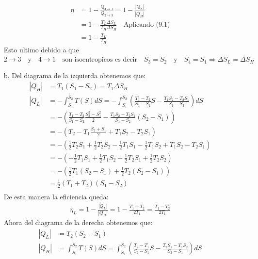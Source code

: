 \documentclass[a4paper]{article}
\begin{document}
\begin{answer}[Punto 9]
\begin{itemize}
            \begin{align*}
                \eta &= 1 - \frac{Q_{4\rightarrow 1}}{Q_{2\rightarrow 3}} = 1 - \frac{|Q_L|}{|Q_H|}\\
                &= 1 - \frac{T_L \Delta S_L}{T_H \Delta S_H} \quad \text{Aplicando (9.1)}\\
                &= 1 - \frac{T_L}{T_H} \quad 
            \end{align*}
            Esto ultimo debido a que  $2\rightarrow 3 \quad \text{y} \quad 4\rightarrow 1 \quad \text{son isoentropicos es decir} \quad S_3 = S_2 \quad \text{y} \quad S_4 = S_1 \Rightarrow \Delta S_L = \Delta S_H$
            \item [b.] Del diagrama de la izquierda obtenemos que:
            \begin{align*}
                |Q_H| &= T_1 (S_ 1- S_2)= T_1 \Delta S_H \\
                |Q_L| &= -\int_{S_1}^{S_2} T(S) dS = -\int_{S_1}^{S_2} \left( \frac{T_1 - T_2 }{S_1 - S_2}S - \frac{T_1S_2 - T_2S_1}{S_1 - S_2}\right)dS \\
                &= -\left( \frac{T_1 - T_2 }{S_1 - S_2} \frac{S_2^2 - S_1^2}{2} - \frac{T_1S_2 - T_2S_1}{S_1 - S_2} (S_2 - S_1)\right)\\
                &=-\left( T_2 - T_1 \frac{S_2 + S_1}{2} + T_1S_2 - T_2S_1\right)\\
                &= - \left(\frac 12 T_2S_1 + \frac 12 T_2 S_2 - \frac 12 T_1 S_1 - \frac 12 T_1 S_2  + T_1S_2 -T_2S_1\right)\\
                &= - \left( -\frac 12 T_1 S_1 + \frac 12 T_1 S_2 - \frac 12 T_2 S_1 + \frac 12 T_2 S_2 \right)\\
                &= - \left( \frac 12 T_1 (S_2 - S_1) + \frac 12 T_2 (S_2- S_1) \right)\\
                &= \frac 12 (T_1 + T_2) (S_1 - S_2)\\
            \end{align*}
            De esta manera la eficiencia queda:
            \begin{align*}
                \eta_L = 1 - \frac{|Q_L|}{|Q_H|} = 1 - \frac{T_1 + T_2}{2T_1} = \frac{T_1 - T_2}{2T_1}
            \end{align*}
            Ahora del  diagrama de la derecha obtenemos que:
            \begin{align*}
                |Q_L| &= T_2 (S_ 2- S_1)\\
                |Q_H| &= \int_{S_1}^{S_2} T(S) dS = \int_{S_1}^{S_2} \left( \frac{T_2 - T_1 }{S_2 - S_1}S - \frac{T_2S_1 - T_1S_2}{S_2 - S_1}\right)dS \\

\end{align*}
\end{itemize}
\end{answer}
\end{document}
